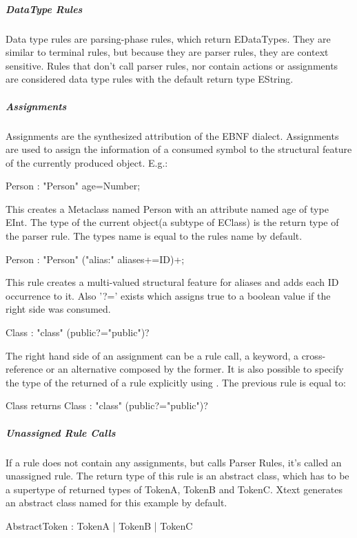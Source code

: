 \subparagraph{DataType Rules}
Data type rules are parsing-phase rules, which return EDataTypes. They are similar to terminal rules, but because they are parser rules, they are context sensitive. Rules that don't call parser rules, nor contain actions or assignments are considered data type rules with the default return type EString. 
\begin{xtxt}
Number returns ecore::EInt : NUM ('.' NUM*)?;}
\end{xtxt}

\subparagraph{Assignments}
Assignments are the synthesized attribution of the EBNF dialect. Assignments are used to assign the information of a consumed symbol to the structural feature of the currently produced object. E.g.:
\begin{xtxt}
Person : "Person" age=Number;
\end{xtxt}
This creates a Metaclass named Person with an attribute named age of type EInt. 
The type of the current object(a subtype of EClass) is the return type of the parser rule. The types name is equal to the rules name by default.
\begin{xtxt}
Person : "Person" ("alias:" aliases+=ID)+;
\end{xtxt}
This rule creates a multi-valued structural feature for aliases and adds each ID occurrence to it. Also '?=' exists which assigns true to a boolean value if the right side was consumed.
\begin{xtxt}
Class : "class" (public?="public")?
\end{xtxt}
The right hand side of an assignment can be a rule call, a keyword, a cross-reference or an alternative composed by the former. It is also possible to specify the type of the returned  of a rule explicitly using . The previous rule is equal to:
\begin{xtxt}
Class returns Class : "class" (public?="public")?
\end{xtxt}

\subparagraph{Unassigned Rule Calls}
If a rule does not contain any assignments, but calls Parser Rules, it's called an unassigned rule. The return type of this rule is an abstract class, which has to be a supertype of returned types of TokenA, TokenB and TokenC. Xtext generates an abstract class named  for this example by default.
\begin{xtxt}
AbstractToken :	TokenA |	TokenB |	TokenC
\end{xtxt}


